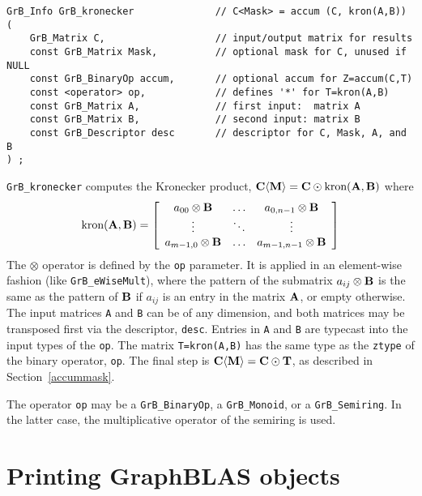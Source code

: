 \documentclass[12pt]{article}
\begin{document}
\begin{mdframed}[userdefinedwidth=6in]
{\footnotesize
\begin{verbatim}
GrB_Info GrB_kronecker              // C<Mask> = accum (C, kron(A,B))
(
    GrB_Matrix C,                   // input/output matrix for results
    const GrB_Matrix Mask,          // optional mask for C, unused if NULL
    const GrB_BinaryOp accum,       // optional accum for Z=accum(C,T)
    const <operator> op,            // defines '*' for T=kron(A,B)
    const GrB_Matrix A,             // first input:  matrix A
    const GrB_Matrix B,             // second input: matrix B
    const GrB_Descriptor desc       // descriptor for C, Mask, A, and B
) ;
\end{verbatim} } \end{mdframed}

\verb'GrB_kronecker' computes the Kronecker product,
${\bf C \langle M \rangle = C \odot \mbox{kron}(A,B)}$ where
\[
\mbox{kron}{\bf (A,B)} =
\left[
    \begin{array}{ccc}
    a_{00} \otimes {\bf B} & \ldots & a_{0,n-1} \otimes {\bf B} \\
    \vdots & \ddots & \vdots \\
    a_{m-1,0} \otimes {\bf B} & \ldots & a_{m-1,n-1} \otimes {\bf B} \\
    \end{array}
\right]
\]
The $\otimes$ operator is defined by the \verb'op' parameter.  It is applied in
an element-wise fashion (like \verb'GrB_eWiseMult'), where the pattern of the
submatrix $a_{ij} \otimes {\bf B}$ is the same as the pattern of ${\bf B}$ if
$a_{ij}$ is an entry in the matrix ${\bf A}$, or empty otherwise.  The input
matrices \verb'A' and \verb'B' can be of any dimension, and both matrices may
be transposed first via the descriptor, \verb'desc'.  Entries in \verb'A' and
\verb'B' are typecast into the input types of the \verb'op'.  The matrix
\verb'T=kron(A,B)' has the same type as the \verb'ztype' of the binary
operator, \verb'op'.  The final step is ${\bf C \langle M \rangle  = C \odot
T}$, as described in Section~\ref{accummask}.

The operator \verb'op' may be a \verb'GrB_BinaryOp', a \verb'GrB_Monoid', or a
\verb'GrB_Semiring'.  In the latter case, the multiplicative operator of
the semiring is used.

\newpage
\section{Printing GraphBLAS objects} %
\label{fprint}
\end{document}
